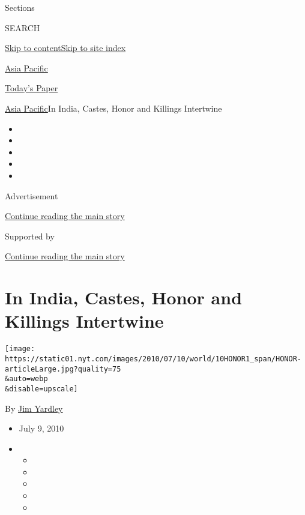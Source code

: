 Sections

SEARCH

\protect\hyperlink{site-content}{Skip to
content}\protect\hyperlink{site-index}{Skip to site index}

\href{https://www.nytimes.com/section/world/asia}{Asia Pacific}

\href{https://myaccount.nytimes.com/auth/login?response_type=cookie\&client_id=vi}{}

\href{https://www.nytimes.com/section/todayspaper}{Today's Paper}

\href{/section/world/asia}{Asia Pacific}\textbar{}In India, Castes,
Honor and Killings Intertwine

\begin{itemize}
\item
\item
\item
\item
\item
\end{itemize}

Advertisement

\protect\hyperlink{after-top}{Continue reading the main story}

Supported by

\protect\hyperlink{after-sponsor}{Continue reading the main story}

\hypertarget{in-india-castes-honor-and-killings-intertwine}{%
\section{In India, Castes, Honor and Killings
Intertwine}\label{in-india-castes-honor-and-killings-intertwine}}

\texttt{[image: https://static01.nyt.com/images/2010/07/10/world/10HONOR1\_span/HONOR-articleLarge.jpg?quality=75\\\&auto=webp\\\&disable=upscale]}

By \href{https://www.nytimes.com/by/jim-yardley}{Jim Yardley}

\begin{itemize}
\item
  July 9, 2010
\item
  \begin{itemize}
  \item
  \item
  \item
  \item
  \item
  \end{itemize}
\end{itemize}

